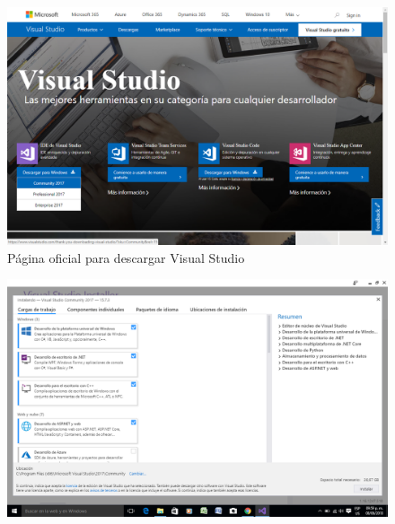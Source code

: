 \documentclass[12pt,a4paper]{report}
\begin{document}
\begin{figure}[hbtp]
\centering
\includegraphics[width=16cm]{Csh_Imagenes/Descarga1.png}
\caption{Página oficial para descargar Visual Studio}
\end{figure}
\begin{figure}[hbtp]
\centering
\includegraphics[width=16cm]{Csh_Imagenes/Instalacion.png}
\caption{}
\end{figure}	
\end{document}
